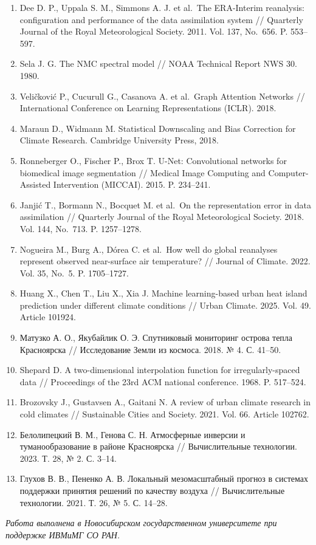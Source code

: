 \documentclass[14pt,a4paper]{extarticle}
\numberwithin{table}{section}
\numberwithin{figure}{section}
\numberwithin{equation}{section}
\begin{document}
\begin{enumerate}
  Cambridge University Press, 2003.
\item
  Dee D. P., Uppala S. M., Simmons A. J. et al.~The ERA-Interim
  reanalysis: configuration and performance of the data assimilation
  system // Quarterly Journal of the Royal Meteorological Society. 2011.
  Vol. 137, No.~656. P. 553--597.
\item
  Sela J. G. The NMC spectral model // NOAA Technical Report NWS 30.
  1980.
\item
  Veličković P., Cucurull G., Casanova A. et al.~Graph Attention
  Networks // International Conference on Learning Representations
  (ICLR). 2018.
\item
  Maraun D., Widmann M. Statistical Downscaling and Bias Correction for
  Climate Research. Cambridge University Press, 2018.
\item
  Ronneberger O., Fischer P., Brox T. U-Net: Convolutional networks for
  biomedical image segmentation // Medical Image Computing and
  Computer-Assisted Intervention (MICCAI). 2015. P. 234--241.
\item
  Janjić T., Bormann N., Bocquet M. et al.~On the representation error
  in data assimilation // Quarterly Journal of the Royal Meteorological
  Society. 2018. Vol. 144, No.~713. P. 1257--1278.
\item
  Nogueira M., Burg A., Dórea C. et al.~How well do global reanalyses
  represent observed near-surface air temperature? // Journal of
  Climate. 2022. Vol. 35, No.~5. P. 1705--1727.
\item
  Huang X., Chen T., Liu X., Xia J. Machine learning-based urban heat
  island prediction under different climate conditions // Urban Climate.
  2025. Vol. 49. Article 101924.
\item
  Матузко А. О., Якубайлик О. Э. Спутниковый мониторинг острова тепла
  Красноярска // Исследование Земли из космоса. 2018. № 4. С. 41--50.
\item
  Shepard D. A two-dimensional interpolation function for
  irregularly-spaced data // Proceedings of the 23rd ACM national
  conference. 1968. P. 517--524.
\item
  Brozovsky J., Gustavsen A., Gaitani N. A review of urban climate
  research in cold climates // Sustainable Cities and Society. 2021.
  Vol. 66. Article 102762.
\item
  Белолипецкий В. М., Генова С. Н. Атмосферные инверсии и
  туманообразование в районе Красноярска // Вычислительные технологии.
  2023. Т. 28, № 2. С. 3--14.
\item
  Глухов В. В., Пененко А. В. Локальный мезомасштабный прогноз в
  системах поддержки принятия решений по качеству воздуха //
  Вычислительные технологии. 2021. Т. 26, № 5. С. 14--28.
\end{enumerate}


\emph{Работа выполнена в Новосибирском государственном университете при
поддержке ИВМиМГ СО РАН.}
\end{document}
